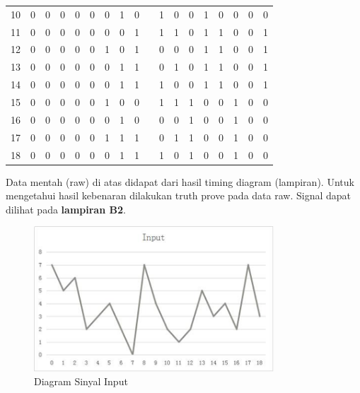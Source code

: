 \begin{table}[H]
\begin{tabular}{|c|c|c|c|c|c|c|c|c|c|c|c|c|c|c|c|c|c|}
		\cline{1-9}\cline{11-18}    10    & 0     & 0     & 0     & 0     & 0     & 0     & 1     & 0     &       & 1     & 0     & 0     & 1     & 0     & 0     & 0     & 0 \bigstrut\\
		\cline{1-9}\cline{11-18}    11    & 0     & 0     & 0     & 0     & 0     & 0     & 0     & 1     &       & 1     & 1     & 0     & 1     & 1     & 0     & 0     & 1 \bigstrut\\
		\cline{1-9}\cline{11-18}    12    & 0     & 0     & 0     & 0     & 0     & 1     & 0     & 1     &       & 0     & 0     & 0     & 1     & 1     & 0     & 0     & 1 \bigstrut\\
		\cline{1-9}\cline{11-18}    13    & 0     & 0     & 0     & 0     & 0     & 0     & 1     & 1     &       & 0     & 1     & 0     & 1     & 1     & 0     & 0     & 1 \bigstrut\\
		\cline{1-9}\cline{11-18}    14    & 0     & 0     & 0     & 0     & 0     & 0     & 1     & 1     &       & 1     & 0     & 0     & 1     & 1     & 0     & 0     & 1 \bigstrut\\
		\cline{1-9}\cline{11-18}    15    & 0     & 0     & 0     & 0     & 0     & 1     & 0     & 0     &       & 1     & 1     & 1     & 0     & 0     & 1     & 0     & 0 \bigstrut\\
		\cline{1-9}\cline{11-18}    16    & 0     & 0     & 0     & 0     & 0     & 0     & 1     & 0     &       & 0     & 0     & 1     & 0     & 0     & 1     & 0     & 0 \bigstrut\\
		\cline{1-9}\cline{11-18}    17    & 0     & 0     & 0     & 0     & 0     & 1     & 1     & 1     &       & 0     & 1     & 1     & 0     & 0     & 1     & 0     & 0 \bigstrut\\
		\cline{1-9}\cline{11-18}    18    & 0     & 0     & 0     & 0     & 0     & 0     & 1     & 1     &       & 1     & 0     & 1     & 0     & 0     & 1     & 0     & 0 \bigstrut\\
		\hline
	\end{tabular}%
\end{table}%

Data mentah (raw) di atas didapat dari hasil timing diagram (lampiran). Untuk mengetahui hasil kebenaran dilakukan truth prove pada data raw. Signal dapat dilihat pada \textbf{lampiran B2}.

\begin{figure}
	\centering
	\includegraphics[width=0.8\textwidth]
	{pics/din.png}
	\caption{Diagram Sinyal Input}
	\label{Diagram Data Input}
\end{figure}

